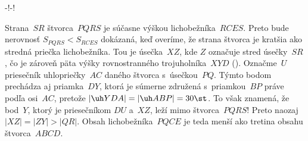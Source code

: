 {\midinsert
\centerline{\inspicture-!\hss\inspicture-!}
\endinsert

Strana~$SR$ štvorca~$PQRS$ je súčasne výškou lichobežníka~$RCES$.
Preto bude nerovnosť $S_{PQRS}<S_{RCES}$ dokázaná,
keď overíme, že strana štvorca
je kratšia ako stredná priečka lichobežníka. Tou je úsečka~$XZ$,
kde $Z$ označuje stred úsečky~$SR$, čo je zároveň päta výšky
rovnostranného trojuholníka~$XYD$ (\obr). Označme~$U$ priesečník
uhlopriečky~$AC$ daného štvorca s~úsečkou~$PQ$. Týmto bodom
prechádza aj priamka~$DY$, ktorá je súmerne združená s~priamkou~$BP$
práve podľa osi~$AC$, pretože $|\uh YDA|=|\uh ABP|=30\st$. To však
znamená, že bod~$Y$, ktorý je priesečníkom $DU$ a~$XZ$, leží mimo
štvorca~$PQRS$! Preto naozaj $|XZ|=|ZY|>|QR|$.
Obsah lichobežníka~$PQCE$ je teda menší ako tretina obsahu
štvorca~$ABCD$.}

